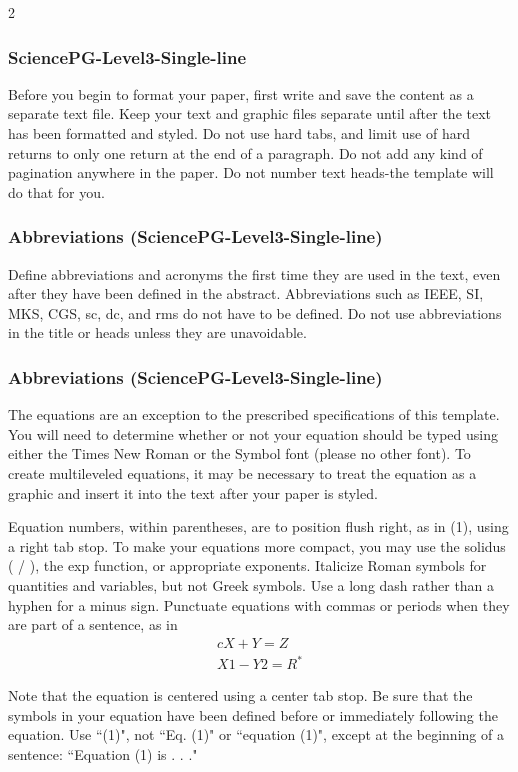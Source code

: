 ﻿\documentclass{book}
\theoremstyle{remark}
\begin{document}
\begin{multicols}{2}
\subsubsection{SciencePG-Level3-Single-line}
Before you begin to format your paper, first write and save the content as a separate text file. Keep your text and graphic files separate until after the text has been formatted and styled. Do not use hard tabs, and limit use of hard returns to only one return at the end of a paragraph. Do not add any kind of pagination anywhere in the paper. Do not number text heads-the template will do that for you.

\subsubsection{Abbreviations (SciencePG-Level3-Single-line)}
Define abbreviations and acronyms the first time they are used in the text, even after they have been defined in the abstract. Abbreviations such as IEEE, SI, MKS, CGS, sc, dc, and rms do not have to be defined. Do not use abbreviations in the title or heads unless they are unavoidable.

\subsubsection{Abbreviations (SciencePG-Level3-Single-line)}
The equations are an exception to the prescribed specifications of this template. You will need to determine whether or not your equation should be typed using either the Times New Roman or the Symbol font (please no other font). To create multileveled equations, it may be necessary to treat the equation as a graphic and insert it into the text after your paper is styled.

Equation numbers, within parentheses, are to position flush right, as in (1), using a right tab stop. To make your equations more compact, you may use the solidus ( / ), the exp function, or appropriate exponents. Italicize Roman symbols for quantities and variables, but not Greek symbols. Use a long dash rather than a hyphen for a minus sign. Punctuate equations with commas or periods when they are part of a sentence, as in
\begin{align}{c}
X+Y=Z   \\
X1-Y2=R^*
\end{align}

Note that the equation is centered using a center tab stop. Be sure that the symbols in your equation have been defined before or immediately following the equation. Use ``(1)", not ``Eq. (1)" or ``equation (1)", except at the beginning of a sentence: ``Equation (1) is . . ."


\end{multicols}
\end{document}
